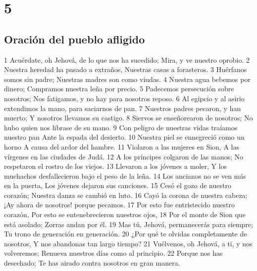 \chapter{5}

\section*{Oración del pueblo afligido}

1 Acuérdate, oh Jehová, de lo que nos ha sucedido;
Mira, y ve nuestro oprobio.
2 Nuestra heredad ha pasado a extraños,
Nuestras casas a forasteros.
3 Huérfanos somos sin padre;
Nuestras madres son como viudas.
4 Nuestra agua bebemos por dinero;
Compramos nuestra leña por precio.
5 Padecemos persecución sobre nosotros;
Nos fatigamos, y no hay para nosotros reposo.
6 Al egipcio y al asirio extendimos la mano, para saciarnos de pan.
7 Nuestros padres pecaron, y han muerto;
Y nosotros llevamos su castigo.
8 Siervos se enseñorearon de nosotros;
No hubo quien nos librase de su mano.
9 Con peligro de nuestras vidas traíamos nuestro pan
Ante la espada del desierto.
10 Nuestra piel se ennegreció como un horno
A causa del ardor del hambre.
11 Violaron a las mujeres en Sion,
A las vírgenes en las ciudades de Judá.
12 A los príncipes colgaron de las manos;
No respetaron el rostro de los viejos.
13 Llevaron a los jóvenes a moler,
Y los muchachos desfallecieron bajo el peso de la leña.
14 Los ancianos no se ven más en la puerta,
Los jóvenes dejaron sus canciones.
15 Cesó el gozo de nuestro corazón;
Nuestra danza se cambió en luto.
16 Cayó la corona de nuestra cabeza;
¡Ay ahora de nosotros! porque pecamos.
17 Por esto fue entristecido nuestro corazón,
Por esto se entenebrecieron nuestros ojos,
18 Por el monte de Sion que está asolado;
Zorras andan por él.
19 Mas tú, Jehová, permanecerás para siempre;
Tu trono de generación en generación.
20 ¿Por qué te olvidas completamente de nosotros,
Y nos abandonas tan largo tiempo?
21 Vuélvenos, oh Jehová, a ti, y nos volveremos;
Renueva nuestros días como al principio.
22 Porque nos has desechado;
Te has airado contra nosotros en gran manera.

